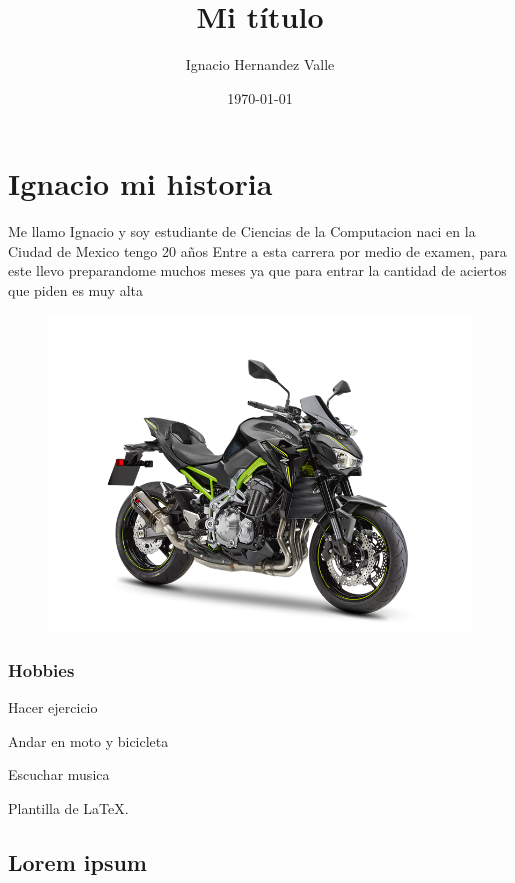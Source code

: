 \documentclass{book}
\author{Ignacio Hernandez Valle}
\title{Mi título}
\date{\today}
\begin{document}
\maketitle
\chapter{Ignacio mi historia}

Me llamo Ignacio y soy estudiante de Ciencias de la Computacion naci en la Ciudad de Mexico tengo 20 años
Entre a esta carrera por medio de examen, para este llevo preparandome muchos meses ya que para entrar la cantidad de aciertos que piden es muy alta 

\begin{figure}[h]
  \centering
  \includegraphics[scale=0.5]{IMG/kawa.png}
  \end{figure}

\subsection{Hobbies}
\begin{enumerate}
  \end{enumerate}
\item Hacer ejercicio
\item Andar en moto y bicicleta
\item Escuchar musica

  


Plantilla de \large{\LaTeX.}


\section{Lorem ipsum}
\end{document}
